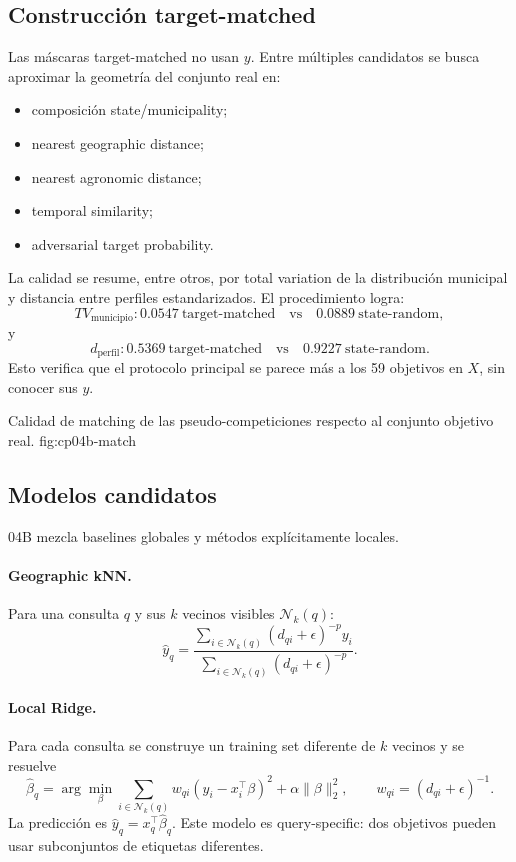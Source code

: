 \subsection{Construcción target-matched}

Las máscaras target-matched no usan $y$. Entre múltiples candidatos se busca aproximar la
geometría del conjunto real en:
\begin{itemize}
\item composición state/municipality;
\item nearest geographic distance;
\item nearest agronomic distance;
\item temporal similarity;
\item adversarial target probability.
\end{itemize}

La calidad se resume, entre otros, por total variation de la distribución municipal y distancia
entre perfiles estandarizados. El procedimiento logra:
\[
TV_{\mathrm{municipio}}:
0.0547\ \text{target-matched}
\quad\text{vs}\quad
0.0889\ \text{state-random},
\]
y
\[
d_{\mathrm{perfil}}:
0.5369\ \text{target-matched}
\quad\text{vs}\quad
0.9227\ \text{state-random}.
\]
Esto verifica que el protocolo principal se parece más a los 59 objetivos en $X$, sin
conocer sus $y$.

{Calidad de matching de las pseudo-competiciones respecto al conjunto objetivo real.}
{fig:cp04b-match}

\subsection{Modelos candidatos}

04B mezcla baselines globales y métodos explícitamente locales.

\paragraph{Geographic kNN.}
Para una consulta $q$ y sus $k$ vecinos visibles $\mathcal N_k(q)$:
\[
\hat y_q
=
\frac{\sum_{i\in\mathcal N_k(q)}
(d_{qi}+\epsilon)^{-p}y_i}
{\sum_{i\in\mathcal N_k(q)}
(d_{qi}+\epsilon)^{-p}}.
\]

\paragraph{Local Ridge.}
Para cada consulta se construye un training set diferente de $k$ vecinos y se resuelve
\begin{equation}
\hat\beta_q
=
\arg\min_{\beta}
\sum_{i\in\mathcal N_k(q)}
w_{qi}
(y_i-x_i^\top\beta)^2
+\alpha\|\beta\|_2^2,
\qquad
w_{qi}=(d_{qi}+\epsilon)^{-1}.
\label{eq:local-ridge}
\end{equation}
La predicción es $\hat y_q=x_q^\top\hat\beta_q$. Este modelo es query-specific: dos objetivos
pueden usar subconjuntos de etiquetas diferentes.

